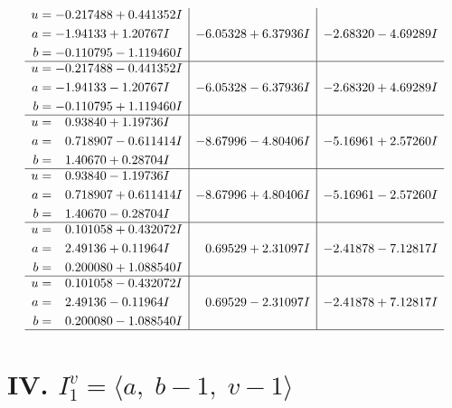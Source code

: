 \documentclass[1p]{elsarticle_modified}
\theoremstyle{definition}
\begin{document}
$$\begin{array}{c|c|c}
\begin{aligned}
u &= -0.217488 + 0.441352 I \\
a &= -1.94133 + 1.20767 I \\
b &= -0.110795 - 1.119460 I\end{aligned}
 & -6.05328 + 6.37936 I & -2.68320 - 4.69289 I \\ \hline\begin{aligned}
u &= -0.217488 - 0.441352 I \\
a &= -1.94133 - 1.20767 I \\
b &= -0.110795 + 1.119460 I\end{aligned}
 & -6.05328 - 6.37936 I & -2.68320 + 4.69289 I \\ \hline\begin{aligned}
u &= \phantom{-}0.93840 + 1.19736 I \\
a &= \phantom{-}0.718907 - 0.611414 I \\
b &= \phantom{-}1.40670 + 0.28704 I\end{aligned}
 & -8.67996 - 4.80406 I & -5.16961 + 2.57260 I \\ \hline\begin{aligned}
u &= \phantom{-}0.93840 - 1.19736 I \\
a &= \phantom{-}0.718907 + 0.611414 I \\
b &= \phantom{-}1.40670 - 0.28704 I\end{aligned}
 & -8.67996 + 4.80406 I & -5.16961 - 2.57260 I \\ \hline\begin{aligned}
u &= \phantom{-}0.101058 + 0.432072 I \\
a &= \phantom{-}2.49136 + 0.11964 I \\
b &= \phantom{-}0.200080 + 1.088540 I\end{aligned}
 & \phantom{-}0.69529 + 2.31097 I & -2.41878 - 7.12817 I \\ \hline\begin{aligned}
u &= \phantom{-}0.101058 - 0.432072 I \\
a &= \phantom{-}2.49136 - 0.11964 I \\
b &= \phantom{-}0.200080 - 1.088540 I\end{aligned}
 & \phantom{-}0.69529 - 2.31097 I & -2.41878 + 7.12817 I\\
 \hline 
 \end{array}$$\newpage\newpage\renewcommand{\arraystretch}{1}
\centering \section*{IV. $I^v_{1}= \langle a,\;b-1,\;v-1 \rangle$}
\end{document}
